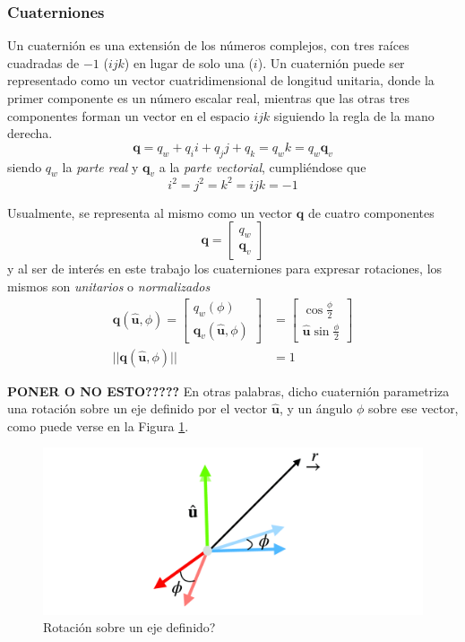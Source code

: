 \subsubsection{Cuaterniones}
Un cuaternión es una extensión de los números complejos, con tres raíces cuadradas de $-1$ ($ijk$) en lugar de solo una ($i$). Un cuaternión puede ser representado como un vector cuatridimensional de longitud unitaria, donde la primer componente es un número escalar real, mientras que las otras tres componentes forman un vector en el espacio $ijk$ siguiendo la regla de la mano derecha. 
\begin{equation}
    \bm{q} = q_w + q_i i + q_j j + q_k = q_w k = q_w \bm{q}_v
\end{equation}
siendo $q_w$ la \textit{parte real} y $\bm{q}_v$ a la \textit{parte vectorial}, cumpliéndose que
\begin{equation}
    i^2=j^2=k^2=ijk=-1
\end{equation}

Usualmente, se representa al mismo como un vector $\bm{q}$ de cuatro componentes
\begin{equation}
    \bm{q} =
    \begin{bmatrix}
    q_w \\
    \bm{q}_v
    \end{bmatrix}
\end{equation}
y al ser de interés en este trabajo los cuaterniones para expresar rotaciones, los mismos son \textit{unitarios} o \textit{normalizados}
\begin{align}
    \bm{q}(\hat{\bm{u}},\phi) =
    \begin{bmatrix}
    q_w(\phi) \\
    \bm{q}_v(\hat{\bm{u}},\phi)
    \end{bmatrix}
    &=
    \begin{bmatrix}
        \cos{\frac{\phi}{2}} \\
        \hat{\bm{u}}\sin{\frac{\phi}{2}}
    \end{bmatrix}
    \\
    ||\bm{q}(\hat{\bm{u}},\phi)|| &= 1
\end{align}

\textbf{PONER O NO ESTO?????}
En otras palabras, dicho cuaternión parametriza una rotación sobre un eje definido por el vector $\hat{\bm{u}}$, y un ángulo $\phi$ sobre ese vector, como puede verse en la Figura \ref{fig:quaternions}.
\begin{figure}
    \centering
    \includegraphics[width=\textwidth]{Img/Quaternions.png}
    \caption{Rotación sobre un eje definido?}
    \label{fig:quaternions}
\end{figure}

